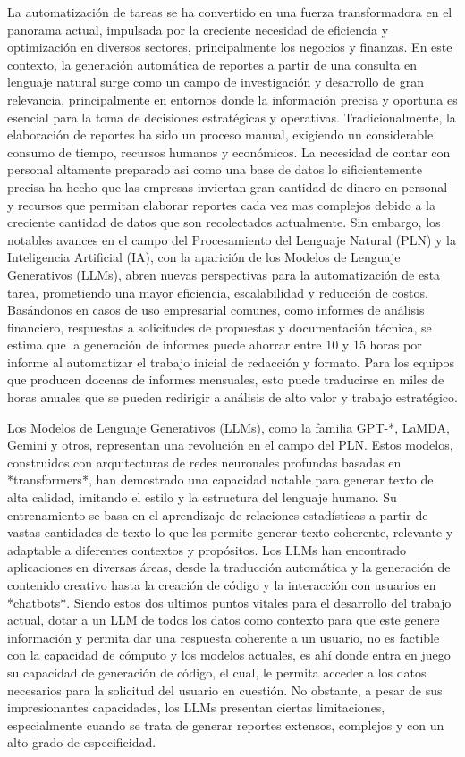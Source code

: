 La automatización de tareas se ha convertido en una fuerza transformadora en el panorama actual, impulsada por la creciente necesidad de eficiencia y optimización en diversos sectores, principalmente los negocios y finanzas. En este contexto, la generación automática de reportes a partir de una consulta en lenguaje natural surge como un campo de investigación y desarrollo de gran relevancia, principalmente en entornos donde la información precisa y oportuna es esencial para la toma de decisiones estratégicas y operativas. Tradicionalmente, la elaboración de reportes ha sido un proceso manual, exigiendo un considerable consumo de tiempo, recursos humanos y económicos. La necesidad de contar con personal altamente preparado asi como una base de datos lo sificientemente precisa ha hecho que las empresas inviertan gran cantidad de dinero en personal y recursos que permitan elaborar reportes cada vez mas complejos debido a la creciente cantidad de datos que son recolectados actualmente. Sin embargo, los notables avances en el campo del Procesamiento del Lenguaje Natural (PLN) y la Inteligencia Artificial (IA), con la aparición de los Modelos de Lenguaje Generativos (LLMs), abren nuevas perspectivas para la automatización de esta tarea, prometiendo una mayor eficiencia, escalabilidad y reducción de costos.
Basándonos en casos de uso empresarial comunes, como informes de análisis financiero, respuestas a solicitudes de propuestas y documentación técnica, se estima que la generación de informes puede ahorrar entre 10 y 15 horas por informe al automatizar el trabajo inicial de redacción y formato. Para los equipos que producen docenas de informes mensuales, esto puede traducirse en miles de horas anuales que se pueden redirigir a análisis de alto valor y trabajo estratégico.

Los Modelos de Lenguaje Generativos (LLMs), como la familia GPT-*, LaMDA, Gemini y otros, representan una revolución en el campo del PLN.  Estos modelos, construidos con arquitecturas de redes neuronales profundas basadas en *transformers*, han demostrado una capacidad notable para generar texto de alta calidad, imitando el estilo y la estructura del lenguaje humano. Su entrenamiento se basa en el aprendizaje de relaciones estadísticas a partir de vastas cantidades de texto lo que les permite generar texto coherente, relevante y adaptable a diferentes contextos y propósitos. Los LLMs han encontrado aplicaciones en diversas áreas, desde la traducción automática y la generación de contenido creativo hasta la creación de código y la interacción con usuarios en *chatbots*. Siendo estos dos ultimos puntos vitales para el desarrollo del trabajo actual, dotar a un LLM de todos los datos como contexto para que este genere información y permita dar una respuesta coherente a un usuario, no es factible con la capacidad de cómputo y los modelos actuales, es ahí donde entra en juego su capacidad de generación de código, el cual, le permita acceder a los datos necesarios para la solicitud del usuario en cuestión. No obstante, a pesar de sus impresionantes capacidades, los LLMs presentan ciertas limitaciones, especialmente cuando se trata de generar reportes extensos, complejos y con un alto grado de especificidad.

